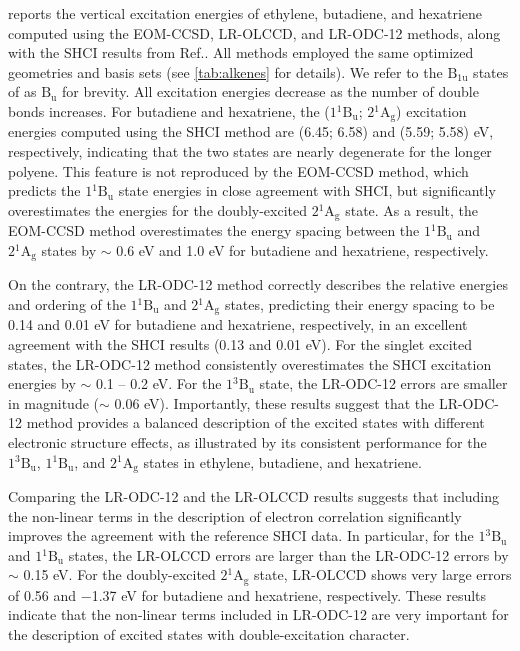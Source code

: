  reports the vertical excitation energies of ethylene,
butadiene, and hexatriene computed using the EOM-CCSD, LR-OLCCD, and LR-ODC-12
methods, along with the SHCI results from Ref.\@ {}.
All methods employed the same optimized geometries and basis sets (see
\cref{tab:alkenes} for details).
We refer to the $\mathrm{B_{1u}}$ states of  as $\mathrm{B_{u}}$ for
brevity.
All excitation energies decrease as the number of double bonds increases.
For butadiene and hexatriene, the ($1{}^1\mathrm{B_{u}}$; $2{}^1\mathrm{A_{g}}$)
excitation energies computed using the SHCI method are (6.45; 6.58) and (5.59;
5.58) eV, respectively, indicating that the two states are nearly degenerate for
the longer polyene.
This feature is not reproduced by the EOM-CCSD method, which predicts the
$1{}^1\mathrm{B_{u}}$ state energies in close agreement with SHCI, but
significantly overestimates the energies for the doubly-excited
$2{}^1\mathrm{A_{g}}$ state.
As a result, the EOM-CCSD method overestimates the energy spacing between the
$1{}^1\mathrm{B_{u}}$ and $2{}^1\mathrm{A_{g}}$ states by $\sim$ 0.6 eV and 1.0
eV for butadiene and hexatriene, respectively. 

On the contrary, the LR-ODC-12 method correctly describes the relative energies
and ordering of the $1{}^1\mathrm{B_{u}}$ and $2{}^1\mathrm{A_{g}}$ states,
predicting their energy spacing to be 0.14 and 0.01 eV for butadiene and
hexatriene, respectively, in an excellent agreement with the SHCI results (0.13
and 0.01 eV).
For the singlet excited states, the LR-ODC-12 method consistently overestimates
the SHCI excitation energies by $\sim$ 0.1 -- 0.2 eV.
For the $1{}^3\mathrm{B_{u}}$ state, the LR-ODC-12 errors are smaller in
magnitude ($\sim$ 0.06 eV).
Importantly, these results suggest that the LR-ODC-12 method provides a balanced
description of the excited states with different electronic structure effects,
as illustrated by its consistent performance for the $1{}^3\mathrm{B_{u}}$,
$1{}^1\mathrm{B_{u}}$, and $2{}^1\mathrm{A_{g}}$ states in ethylene, butadiene,
and hexatriene.

Comparing the LR-ODC-12 and the LR-OLCCD results suggests that including the
non-linear terms in the description of electron correlation significantly
improves the agreement with the reference SHCI data.
In particular, for the $1{}^3\mathrm{B_{u}}$ and $1{}^1\mathrm{B_{u}}$ states,
the LR-OLCCD errors are larger than the LR-ODC-12 errors by $\sim$ 0.15 eV.
For the doubly-excited $2{}^1\mathrm{A_{g}}$ state, LR-OLCCD shows very large
errors of 0.56 and $-$1.37 eV for butadiene and hexatriene, respectively.
These results indicate that the non-linear terms included in LR-ODC-12 are very
important for the description of excited states with double-excitation
character.



